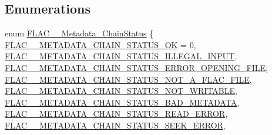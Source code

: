 \subsection*{Enumerations}
\begin{DoxyCompactItemize}
\item 
enum \mbox{\hyperlink{group__flac__metadata__level2_gafe2a924893b0800b020bea8160fd4531}{F\+L\+A\+C\+\_\+\+\_\+\+Metadata\+\_\+\+Chain\+Status}} \{ \newline
\mbox{\hyperlink{group__flac__metadata__level2_ggafe2a924893b0800b020bea8160fd4531a293be942ec54576f2b3c73613af968e9}{F\+L\+A\+C\+\_\+\+\_\+\+M\+E\+T\+A\+D\+A\+T\+A\+\_\+\+C\+H\+A\+I\+N\+\_\+\+S\+T\+A\+T\+U\+S\+\_\+\+OK}} = 0, 
\mbox{\hyperlink{group__flac__metadata__level2_ggafe2a924893b0800b020bea8160fd4531a1be9400982f411173af46bf0c3acbdc7}{F\+L\+A\+C\+\_\+\+\_\+\+M\+E\+T\+A\+D\+A\+T\+A\+\_\+\+C\+H\+A\+I\+N\+\_\+\+S\+T\+A\+T\+U\+S\+\_\+\+I\+L\+L\+E\+G\+A\+L\+\_\+\+I\+N\+P\+UT}}, 
\mbox{\hyperlink{group__flac__metadata__level2_ggafe2a924893b0800b020bea8160fd4531a43d2741a650576052fa3615d8cd64d86}{F\+L\+A\+C\+\_\+\+\_\+\+M\+E\+T\+A\+D\+A\+T\+A\+\_\+\+C\+H\+A\+I\+N\+\_\+\+S\+T\+A\+T\+U\+S\+\_\+\+E\+R\+R\+O\+R\+\_\+\+O\+P\+E\+N\+I\+N\+G\+\_\+\+F\+I\+LE}}, 
\mbox{\hyperlink{group__flac__metadata__level2_ggafe2a924893b0800b020bea8160fd4531a99748a4b12ed10f9368375cc8deeb143}{F\+L\+A\+C\+\_\+\+\_\+\+M\+E\+T\+A\+D\+A\+T\+A\+\_\+\+C\+H\+A\+I\+N\+\_\+\+S\+T\+A\+T\+U\+S\+\_\+\+N\+O\+T\+\_\+\+A\+\_\+\+F\+L\+A\+C\+\_\+\+F\+I\+LE}}, 
\newline
\mbox{\hyperlink{group__flac__metadata__level2_ggafe2a924893b0800b020bea8160fd4531ac469c6543ebb117e99064572c16672d4}{F\+L\+A\+C\+\_\+\+\_\+\+M\+E\+T\+A\+D\+A\+T\+A\+\_\+\+C\+H\+A\+I\+N\+\_\+\+S\+T\+A\+T\+U\+S\+\_\+\+N\+O\+T\+\_\+\+W\+R\+I\+T\+A\+B\+LE}}, 
\mbox{\hyperlink{group__flac__metadata__level2_ggafe2a924893b0800b020bea8160fd4531a8efd2c76dc06308eb6eba59e1bc6300b}{F\+L\+A\+C\+\_\+\+\_\+\+M\+E\+T\+A\+D\+A\+T\+A\+\_\+\+C\+H\+A\+I\+N\+\_\+\+S\+T\+A\+T\+U\+S\+\_\+\+B\+A\+D\+\_\+\+M\+E\+T\+A\+D\+A\+TA}}, 
\mbox{\hyperlink{group__flac__metadata__level2_ggafe2a924893b0800b020bea8160fd4531a0525de5fb5d8aeeb4e848e33a8d503c6}{F\+L\+A\+C\+\_\+\+\_\+\+M\+E\+T\+A\+D\+A\+T\+A\+\_\+\+C\+H\+A\+I\+N\+\_\+\+S\+T\+A\+T\+U\+S\+\_\+\+R\+E\+A\+D\+\_\+\+E\+R\+R\+OR}}, 
\mbox{\hyperlink{group__flac__metadata__level2_ggafe2a924893b0800b020bea8160fd4531a5814bc26bcf92143198b8e7f028f43a2}{F\+L\+A\+C\+\_\+\+\_\+\+M\+E\+T\+A\+D\+A\+T\+A\+\_\+\+C\+H\+A\+I\+N\+\_\+\+S\+T\+A\+T\+U\+S\+\_\+\+S\+E\+E\+K\+\_\+\+E\+R\+R\+OR}}, 
\newline

\end{DoxyCompactItemize}
